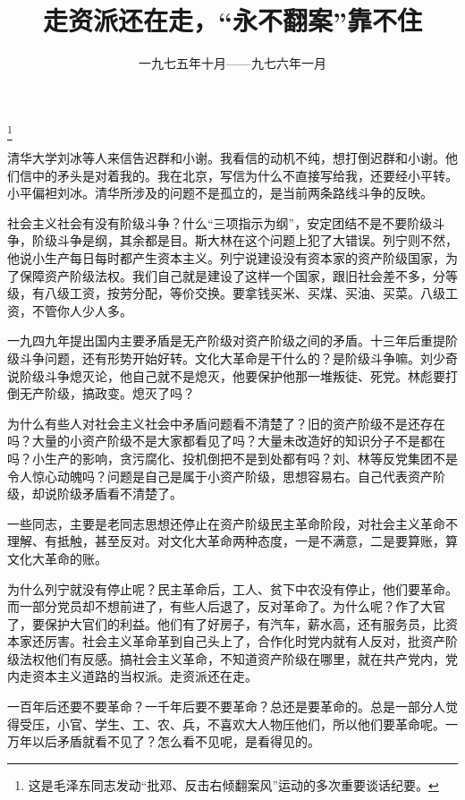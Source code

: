 
\title{走资派还在走，“永不翻案”靠不住}
\date{一九七五年十月——九七六年一月}
\thanks{这是毛泽东同志发动“批邓、反击右倾翻案风”运动的多次重要谈话纪要。}
\maketitle


清华大学刘冰等人来信告迟群和小谢。我看信的动机不纯，想打倒迟群和小谢。他们信中的矛头是对着我的。我在北京，写信为什么不直接写给我，还要经小平转。小平偏袒刘冰。清华所涉及的问题不是孤立的，是当前两条路线斗争的反映。

社会主义社会有没有阶级斗争？什么“三项指示为纲”，安定团结不是不要阶级斗争，阶级斗争是纲，其余都是目。斯大林在这个问题上犯了大错误。列宁则不然，他说小生产每日每时都产生资本主义。列宁说建设没有资本家的资产阶级国家，为了保障资产阶级法权。我们自己就是建设了这样一个国家，跟旧社会差不多，分等级，有八级工资，按劳分配，等价交换。要拿钱买米、买煤、买油、买菜。八级工资，不管你人少人多。

一九四九年提出国内主要矛盾是无产阶级对资产阶级之间的矛盾。十三年后重提阶级斗争问题，还有形势开始好转。文化大革命是干什么的？是阶级斗争嘛。刘少奇说阶级斗争熄灭论，他自己就不是熄灭，他要保护他那一堆叛徒、死党。林彪要打倒无产阶级，搞政变。熄灭了吗？

为什么有些人对社会主义社会中矛盾问题看不清楚了？旧的资产阶级不是还存在吗？大量的小资产阶级不是大家都看见了吗？大量未改造好的知识分子不是都在吗？小生产的影响，贪污腐化、投机倒把不是到处都有吗？刘、林等反党集团不是令人惊心动魄吗？问题是自己是属于小资产阶级，思想容易右。自己代表资产阶级，却说阶级矛盾看不清楚了。

一些同志，主要是老同志思想还停止在资产阶级民主革命阶段，对社会主义革命不理解、有抵触，甚至反对。对文化大革命两种态度，一是不满意，二是要算账，算文化大革命的账。

为什么列宁就没有停止呢？民主革命后，工人、贫下中农没有停止，他们要革命。而一部分党员却不想前进了，有些人后退了，反对革命了。为什么呢？作了大官了，要保护大官们的利益。他们有了好房子，有汽车，薪水高，还有服务员，比资本家还厉害。社会主义革命革到自己头上了，合作化时党内就有人反对，批资产阶级法权他们有反感。搞社会主义革命，不知道资产阶级在哪里，就在共产党内，党内走资本主义道路的当权派。走资派还在走。

一百年后还要不要革命？一千年后要不要革命？总还是要革命的。总是一部分人觉得受压，小官、学生、工、农、兵，不喜欢大人物压他们，所以他们要革命呢。一万年以后矛盾就看不见了？怎么看不见呢，是看得见的。

